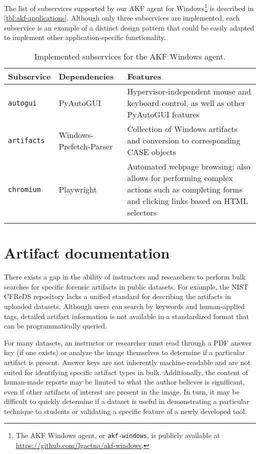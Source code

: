 \documentclass[preprint,12pt]{elsarticle}
\newcommand{\passthrough}[1]{#1}
\begin{document}
The list of subservices supported by our AKF agent for
Windows\footnote{The AKF Windows agent, or
  \passthrough{\lstinline!akf-windows!}, is publicly available at
  \url{https://github.com/lgactna/akf-windows}.} is described in
\autoref{tbl:akf-applications}. Although only three subservices are
implemented, each subservice is an example of a distinct design pattern
that could be easily adapted to implement other application-specific
functionality.


\begin{table*}[tb]
\footnotesize
\centering
\begin{tabularx}{\linewidth}{L{0.2} L{0.2} L{0.6}}
\toprule
  \textbf{Subservice} & \textbf{Dependencies} & \textbf{Features} \\
\midrule
  \passthrough{\lstinline!autogui!} & PyAutoGUI
  \citep{sweigartAsweigartPyautogui2025} & Hypervisor-independent mouse
  and keyboard control, as well as other PyAutoGUI features \\
  \passthrough{\lstinline!artifacts!} & Windows-Prefetch-Parser
  \citep{wittPoorBillionaireWindowsPrefetchParser2021} & Collection of
  Windows artifacts and conversion to corresponding CASE objects \\
  \passthrough{\lstinline!chromium!} & Playwright
  \citep{MicrosoftPlaywrightpython2025} & Automated webpage browsing;
  also allows for performing complex actions such as completing forms and
  clicking links based on HTML selectors \\ \\
\bottomrule
\end{tabularx}
\caption{Implemented subservices for the AKF Windows agent.}\label{tbl:akf-applications}
\end{table*}


\section{Artifact documentation}\label{artifact-documentation}

There exists a gap in the ability of instructors and researchers to
perform bulk searches for specific forensic artifacts in public
datasets. For example, the NIST CFReDS repository lacks a unified
standard for describing the artifacts in uploaded datasets. Although
users can search by keywords and human-applied tags, detailed artifact
information is not available in a standardized format that can be
programmatically queried.

For many datasets, an instructor or researcher must read through a PDF
answer key (if one exists) or analyze the image themselves to determine
if a particular artifact is present. Answer keys are not inherently
machine-readable and are not suited for identifying specific artifact
types in bulk. Additionally, the content of human-made reports may be
limited to what the author believes is significant, even if other
artifacts of interest are present in the image. In turn, it may be
difficult to quickly determine if a dataset is useful in demonstrating a
particular technique to students or validating a specific feature of a
newly developed tool.
\end{document}

